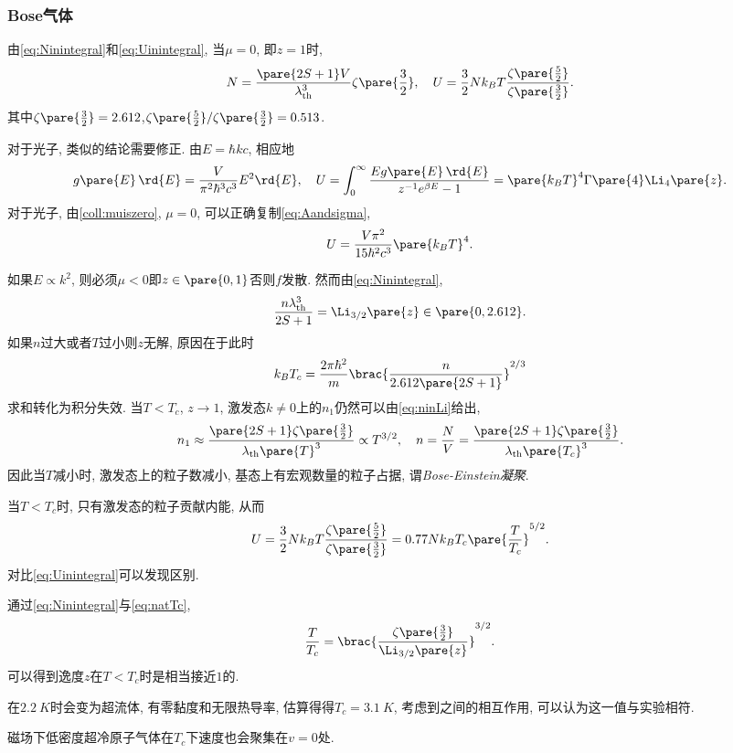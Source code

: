 \documentclass[../Thermal.tex]{subfiles}
\begin{document}
\subsubsection{Bose气体}
由\eqref{eq:Ninintegral}和\eqref{eq:Uinintegral}, 当$\mu = 0$, 即$z=1$时,
\[ N = \frac{\pare{2S+1}V}{\lambda_{\mathrm{th}}^3}\zeta\pare{\frac{3}{2}},\quad U=\frac{3}{2}Nk_BT\frac{\zeta\pare{\frac{5}{2}}}{\zeta\pare{\frac{3}{2}}}. \]
其中$\zeta\pare{\frac{3}{2}} = 2.612$,$\zeta\pare{\frac{5}{2}}/\zeta\pare{\frac{3}{2}}=0.513$.
\begin{ex}
对于光子, 类似的结论需要修正. 由$E = \hbar kc$, 相应地
\[ g\pare{E}\,\rd{E} = \frac{V}{\pi^2\hbar^3c^3}E^2\rd{E},\quad U = \int_0^\infty \frac{Eg\pare{E}\,\rd{E}}{z^{-1}e^{\beta E}-1} = \pare{k_BT}^4\Gamma\pare{4}\Li_4\pare{z}. \]
对于光子, 由\cref{coll:muiszero}, $\mu = 0$, 可以正确复制\eqref{eq:Aandsigma},
\[ U = \frac{V\pi^2}{15\hbar^2c^3}\pare{k_BT}^4. \]
\end{ex}
如果$E\propto k^2$, 则必须$\mu<0$即$z\in\pare{0,1}$否则$f$发散. 然而由\eqref{eq:Ninintegral},
\begin{equation}
\label{eq:ninLi}
\frac{n\lambda_{\mathrm{th}}^3}{2S+1} = \Li_{3/2}\pare{z}\in\pare{0,2.612}.
\end{equation}
如果$n$过大或者$T$过小则$z$无解, 原因在于此时
\[ k_B T_c = \frac{2\pi\hbar^2}{m}\brac{\frac{n}{2.612\pare{2S+1}}}^{2/3} \]
求和转化为积分失效. 当$T<T_c$, $z\rightarrow 1$, 激发态$k\neq 0$上的$n_1$仍然可以由\eqref{eq:ninLi}给出,
\begin{equation}
\label{eq:natTc}
n_1 \approx \frac{\pare{2S+1}\zeta\pare{\frac{3}{2}}}{\lambda_{\mathrm{th}}\pare{T}^3}\propto T^{3/2},\quad n = \frac{N}{V} = \frac{\pare{2S+1}\zeta\pare{\frac{3}{2}}}{\lambda_{\mathrm{th}}\pare{T_c}^3}.
\end{equation}
因此当$T$减小时, 激发态上的粒子数减小, 基态上有宏观数量的粒子占据, 谓\emph{Bose-Einstein凝聚}.
\begin{ex}
当$T<T_c$时, 只有激发态的粒子贡献内能, 从而
\[ U = \frac{3}{2}Nk_BT\frac{\zeta\pare{\frac{5}{2}}}{\zeta\pare{\frac{3}{2}}} = 0.77Nk_BT_c\pare{\frac{T}{T_c}}^{5/2}. \]
对比\eqref{eq:Uinintegral}可以发现区别.
\end{ex}
通过\eqref{eq:Ninintegral}与\eqref{eq:natTc},
\[ \frac{T}{T_c} = \brac{\frac{\zeta\pare{\frac{3}{2}}}{\Li_{3/2}\pare{z}}}^{3/2}. \]
可以得到逸度$z$在$T<T_c$时是相当接近$1$的.
\begin{ex}
在$\SI{2.2}{K}$时会变为超流体, 有零黏度和无限热导率, 估算得得$T_c=\SI{3.1}{K}$, 考虑到之间的相互作用, 可以认为这一值与实验相符.
\end{ex}
\begin{ex}
磁场下低密度超冷原子气体在$T_c$下速度也会聚集在$v=0$处.
\end{ex}
\end{document}
